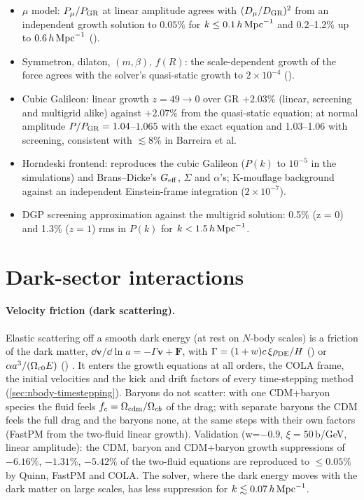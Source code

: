 \begin{validation}
\begin{itemize}
\item $\mu$ model: $P_\mu/P_{\rm GR}$ at linear amplitude agrees with $(D_\mu/D_{\rm GR})^2$ from an independent growth
      solution to $0.05\%$ for $k\le0.1\,h\,\mathrm{Mpc}^{-1}$ and 0.2--1.2\% up to $0.6\,h\,\mathrm{Mpc}^{-1}$ ().
\item Symmetron, dilaton, $(m,\beta)$, $f(R)$: the scale-dependent growth of the force agrees with the solver's
      quasi-static growth to $2\times10^{-4}$ ().
\item Cubic Galileon: linear growth $z=49\to0$ over GR $+2.03\%$ (linear, screening and multigrid alike) against $+2.07\%$
      from the quasi-static equation; at normal amplitude $P/P_{\rm GR}=1.04$--$1.065$ with the exact equation and
      1.03--1.06 with screening, consistent with $\lesssim8\%$ in Barreira et al.
\item Horndeski frontend: reproduces the cubic Galileon ($P(k)$ to $10^{-5}$ in the simulations) and Brans--Dicke's
      $G_{\rm eff}$, $\Sigma$ and $\alpha$'s; K-mouflage background against an independent Einstein-frame integration
      ($2\times10^{-7}$).
\item DGP screening approximation against the multigrid solution: 0.5\% (z = 0) and 1.3\% ($z=1$) rms in $P(k)$ for
      $k<1.5\,h\,\mathrm{Mpc}^{-1}$.
\end{itemize}
\end{validation}

\section{Dark-sector interactions}\label{sec:mgsim-darksector}

\paragraph*{Velocity friction (dark scattering).} Elastic scattering off a smooth dark energy (at rest on $N$-body
scales) is a friction of the dark matter, $\dd\bm v/\dd\ln a=-\Gamma\bm v+\bm F$, with
$\Gamma=(1+w)c\,\xi\rho_{\rm DE}/H$ () or $\alpha a^3/(\Omega_{c0}E)$
() \cite{Simpson2010,BaldiSimpson2015}. It enters the growth equations at all orders,
the COLA frame, the initial velocities and the kick and drift factors of every time-stepping method
(\cref{sec:nbody-timestepping}). Baryons do not scatter: with one CDM+baryon species the fluid feels
$f_c=\Omega_{\rm cdm}/\Omega_{cb}$ of the drag; with separate baryons the CDM feels the full drag and the baryons none, at the
same steps with their own factors (FastPM from the two-fluid linear growth). Validation (w=$-0.9$, $\xi=50$\,b/GeV,
linear amplitude): the CDM, baryon and CDM+baryon growth suppressions of $-6.16\%$, $-1.31\%$, $-5.42\%$ of the
two-fluid equations are reproduced to $\le0.05\%$ by Quinn, FastPM and COLA. The solver, where the dark energy moves
with the dark matter on large scales, has less suppression for $k\lesssim0.07\,h\,\mathrm{Mpc}^{-1}$.

